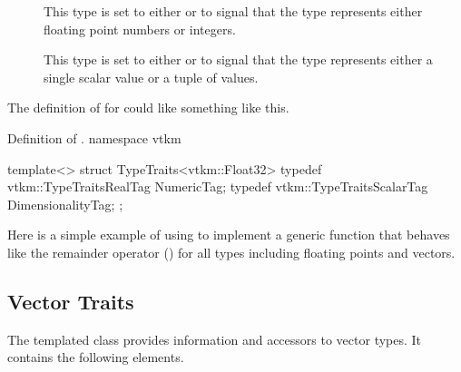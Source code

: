 \begin{description}
\item[]  
  This type is set to either  or
   to signal that the type represents either
  floating point numbers or integers.
\item[] 
   This type is set to either
   or  to signal that
  the type represents either a single scalar value or a tuple of values.
\end{description}

The definition of  for  could like something
like this.
\begin{vtkmexample}{Definition of \protect {}.}
namespace vtkm {

template<>
struct TypeTraits<vtkm::Float32>
{
  typedef vtkm::TypeTraitsRealTag NumericTag;
  typedef vtkm::TypeTraitsScalarTag DimensionalityTag;
};

}
\end{vtkmexample}

Here is a simple example of using  to implement a generic
function that behaves like the remainder operator (\textcode{\%}) for all
types including floating points and vectors.




\subsection{Vector Traits}

The  templated class provides information and
accessors to vector types. It contains the following elements.


